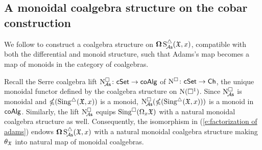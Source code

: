 \subsection{A monoidal coalgebra structure on the cobar construction}

We follow \cite{baues1998hopf} to construct a coalgebra structure on $\cobar \sSchainsA(\fX,x)$, compatible with both the differential and monoid structure, such that Adams's map becomes a map of monoids in the category of coalgebras.

Recall the Serre coalgebra lift $\cchainsA \colon \cSet \to \coAlg$ of $\cchains \colon \cSet \to \Ch$, the unique monoidal functor defined by the coalgebra structure on $\chains(\cube^1)$.
Since $\cchainsA$ is monoidal and $\ccobar(\sSing(\fX,x))$ is a monoid, $\cchainsA(\ccobar(\sSing(\fX,x)))$ is a monoid in $\coAlg$.
Similarly, the lift $\cchainsA$ equips $\cSing(\loops_x \fX)$ with a natural monoidal coalgebra structure as well.
Consequently, the isomorphism in (\ref{e:factorization of adams}) endows $\cobar \sSchainsA(\fX,x)$ with a natural monoidal coalgebra structure making $\theta_\fX$ into natural map of monoidal coalgebras.

